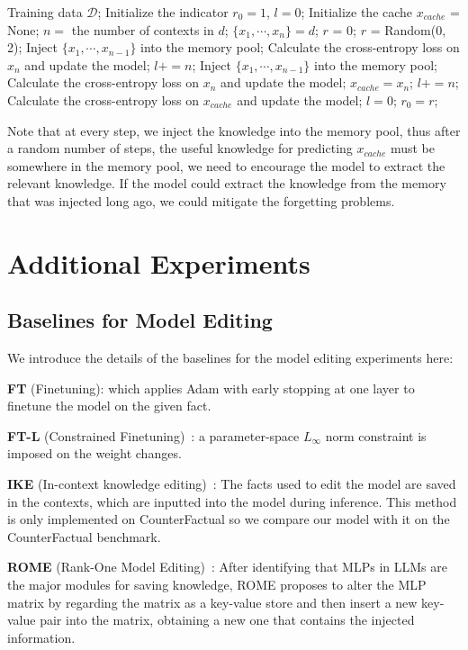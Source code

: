 \begin{algorithm}[H]
\caption{Training Strategy for Mitigating Forgetting Problems}
\label{alg:training_strategy}
\begin{algorithmic}[1]
\REQUIRE Training data $\mathcal{D}$;
\STATE Initialize the indicator $r_0=1$, $l=0$;
\STATE Initialize the cache $x_{cache}$ = None;
\STATE $n = $ the number of contexts in $d$;
\STATE $\{x_1, \cdots, x_n\} = d$;
    \STATE $r$ = 0; 
\ELSE
    \STATE $r$ = Random(0, 2);
\ENDIF
{}
    \STATE Inject $\{x_1,\cdots,x_{n-1}\}$ into the memory pool; 
    \STATE Calculate the cross-entropy loss on $x_n$ and update the model;
    \STATE $l+=n$;
    \STATE Inject $\{x_1,\cdots,x_{n-1}\}$ into the memory pool; 
    \STATE Calculate the cross-entropy loss on $x_n$ and update the model;
    \STATE $x_{cache} = x_n$;
    \STATE $l+=n$;
    \STATE Calculate the cross-entropy loss on $x_{cache}$ and update the model; 
    \STATE $l=0$;
\ENDIF
\STATE $r_0=r$;
\ENDFOR
\end{algorithmic}
\end{algorithm}
Note that at every step, we inject the knowledge into the memory pool, thus after a random number of steps, the useful knowledge for predicting $x_{cache}$ must be somewhere in the memory pool, we need to encourage the model to extract the relevant knowledge. If the model could extract the knowledge from the memory that was injected long ago, we could mitigate the forgetting problems. 


\section{Additional Experiments}
\subsection{Baselines for Model Editing}
\label{sub:baselines_for_model_editing}
We introduce the details of the baselines for the model editing experiments here: 

\textbf{FT} (Finetuning): which applies Adam with early stopping at one layer to finetune the model on the given fact.

\textbf{FT-L} (Constrained Finetuning)~\citep{ModifyingMemories}: a parameter-space $L_{\infty}$ norm constraint is imposed on the weight changes. 

\textbf{IKE} (In-context knowledge editing)~\citep{ike}: The facts used to edit the model are saved in the contexts, which are inputted into the model during inference. This method is only implemented on CounterFactual so we compare our model with it on the CounterFactual benchmark. 

\textbf{ROME} (Rank-One Model Editing)~\citep{ROME}: After identifying that MLPs in LLMs are the major modules for saving knowledge, ROME proposes to alter the MLP matrix by regarding the matrix as a key-value store and then insert a new key-value pair into the matrix, obtaining a new one that contains the injected information. 


